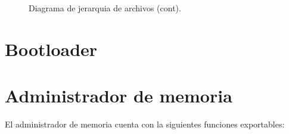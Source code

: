 \documentclass[a4paper,10pt]{article}
\begin{document}
\begin{figure}[H]
\centering
{}
\caption{Diagrama de jerarquia de archivos (cont).}
\end{figure}


\section*{Bootloader}


\section*{Administrador de memoria}
El administrador de memoria cuenta con la siguientes funciones exportables:
\end{document}

